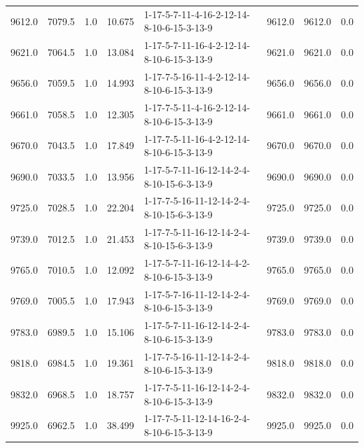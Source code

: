\begin{tabular}{rrrrlrrr}
  9612.0 &  7079.5 &            1.0 &             10.675 &  1-17-5-7-11-4-16-2-12-14-8-10-6-15-3-13-9 &        9612.0 &          9612.0 &       0.0 \\
  9621.0 &  7064.5 &            1.0 &             13.084 &  1-17-5-7-11-16-4-2-12-14-8-10-6-15-3-13-9 &        9621.0 &          9621.0 &       0.0 \\
  9656.0 &  7059.5 &            1.0 &             14.993 &  1-17-7-5-16-11-4-2-12-14-8-10-6-15-3-13-9 &        9656.0 &          9656.0 &       0.0 \\
  9661.0 &  7058.5 &            1.0 &             12.305 &  1-17-7-5-11-4-16-2-12-14-8-10-6-15-3-13-9 &        9661.0 &          9661.0 &       0.0 \\
  9670.0 &  7043.5 &            1.0 &             17.849 &  1-17-7-5-11-16-4-2-12-14-8-10-6-15-3-13-9 &        9670.0 &          9670.0 &       0.0 \\
  9690.0 &  7033.5 &            1.0 &             13.956 &  1-17-5-7-11-16-12-14-2-4-8-10-15-6-3-13-9 &        9690.0 &          9690.0 &       0.0 \\
  9725.0 &  7028.5 &            1.0 &             22.204 &  1-17-7-5-16-11-12-14-2-4-8-10-15-6-3-13-9 &        9725.0 &          9725.0 &       0.0 \\
  9739.0 &  7012.5 &            1.0 &             21.453 &  1-17-7-5-11-16-12-14-2-4-8-10-15-6-3-13-9 &        9739.0 &          9739.0 &       0.0 \\
  9765.0 &  7010.5 &            1.0 &             12.092 &  1-17-5-7-11-16-12-14-4-2-8-10-6-15-3-13-9 &        9765.0 &          9765.0 &       0.0 \\
  9769.0 &  7005.5 &            1.0 &             17.943 &  1-17-5-7-16-11-12-14-2-4-8-10-6-15-3-13-9 &        9769.0 &          9769.0 &       0.0 \\
  9783.0 &  6989.5 &            1.0 &             15.106 &  1-17-5-7-11-16-12-14-2-4-8-10-6-15-3-13-9 &        9783.0 &          9783.0 &       0.0 \\
  9818.0 &  6984.5 &            1.0 &             19.361 &  1-17-7-5-16-11-12-14-2-4-8-10-6-15-3-13-9 &        9818.0 &          9818.0 &       0.0 \\
  9832.0 &  6968.5 &            1.0 &             18.757 &  1-17-7-5-11-16-12-14-2-4-8-10-6-15-3-13-9 &        9832.0 &          9832.0 &       0.0 \\
  9925.0 &  6962.5 &            1.0 &             38.499 &  1-17-7-5-11-12-14-16-2-4-8-10-6-15-3-13-9 &        9925.0 &          9925.0 &       0.0 \\

\end{tabular}
